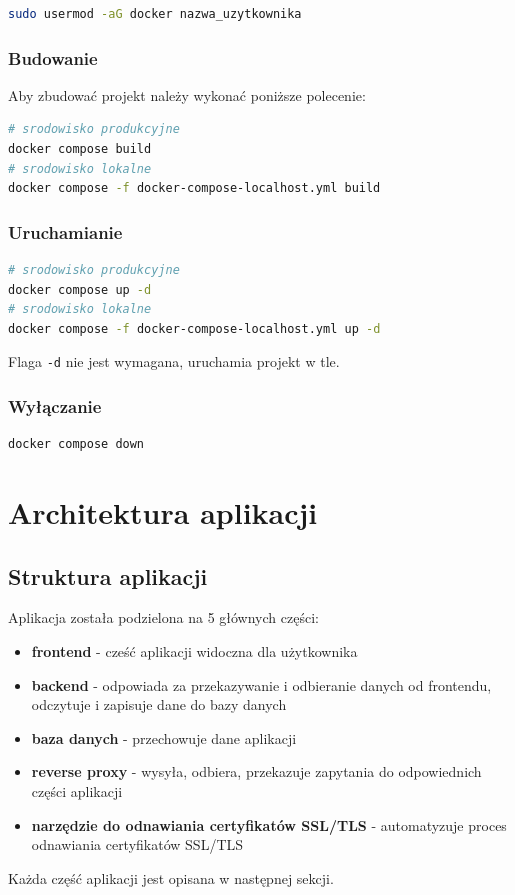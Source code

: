 \documentclass[shortabstract]{iithesis}
\begin{document}
\begin{lstlisting}[language=bash]
sudo usermod -aG docker nazwa_uzytkownika
\end{lstlisting}

\subsection{Budowanie}
Aby zbudować projekt należy wykonać poniższe polecenie:

\begin{lstlisting}[language=bash]
# srodowisko produkcyjne
docker compose build
# srodowisko lokalne
docker compose -f docker-compose-localhost.yml build
\end{lstlisting}

\subsection{Uruchamianie}
\begin{lstlisting}[language=bash]
# srodowisko produkcyjne
docker compose up -d
# srodowisko lokalne
docker compose -f docker-compose-localhost.yml up -d
\end{lstlisting}
Flaga \texttt{-d} nie jest wymagana, uruchamia projekt w tle.

\subsection{Wyłączanie}
\begin{lstlisting}[language=bash]
docker compose down
\end{lstlisting}

\chapter{Architektura aplikacji}
\section{Struktura aplikacji}
Aplikacja została podzielona na 5 głównych części:
\begin{itemize}
    \item \textbf{frontend} - cześć aplikacji widoczna dla użytkownika
    \item \textbf{backend} - odpowiada za przekazywanie i odbieranie danych od frontendu, odczytuje i zapisuje dane do bazy danych
    \item \textbf{baza danych} - przechowuje dane aplikacji
    \item \textbf{reverse proxy} - wysyła, odbiera, przekazuje zapytania do odpowiednich części aplikacji
    \item \textbf{narzędzie do odnawiania certyfikatów SSL/TLS} - automatyzuje proces odnawiania certyfikatów SSL/TLS
\end{itemize}
Każda część aplikacji jest opisana w następnej sekcji.
\end{document}
